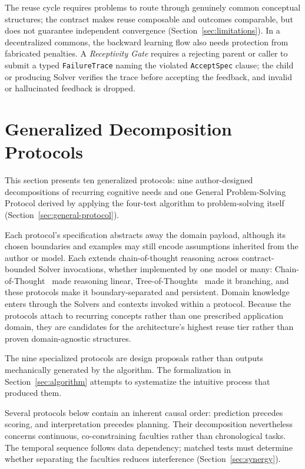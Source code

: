 \documentclass[11pt]{article}
\let\oldtexttt\texttt
\renewcommand{\texttt}[1]{\oldtexttt{\small #1}}
\begin{document}
The reuse cycle requires problems to route through genuinely common conceptual structures; the contract makes reuse composable and outcomes comparable, but does not guarantee independent convergence (Section~\ref{sec:limitations}). In a decentralized commons, the backward learning flow also needs protection from fabricated penalties. A \emph{Receptivity Gate}\label{sec:receptivity} requires a rejecting parent or caller to submit a typed \texttt{FailureTrace} naming the violated \texttt{AcceptSpec} clause; the child or producing Solver verifies the trace before accepting the feedback, and invalid or hallucinated feedback is dropped.

\section{Generalized Decomposition Protocols}
\label{sec:discussion}

This section presents ten generalized protocols: nine author-designed decompositions of recurring cognitive needs and one General Problem-Solving Protocol derived by applying the four-test algorithm to problem-solving itself (Section~\ref{sec:general-protocol}).

Each protocol's specification abstracts away the domain payload, although its chosen boundaries and examples may still encode assumptions inherited from the author or model. Each extends chain-of-thought reasoning across contract-bounded Solver invocations, whether implemented by one model or many: Chain-of-Thought~\cite{wei2022} made reasoning linear, Tree-of-Thoughts~\cite{yao2023} made it branching, and these protocols make it boundary-separated and persistent. Domain knowledge enters through the Solvers and contexts invoked within a protocol. Because the protocols attach to recurring concepts rather than one prescribed application domain, they are candidates for the architecture's highest reuse tier rather than proven domain-agnostic structures.

The nine specialized protocols are design proposals rather than outputs mechanically generated by the algorithm. The formalization in Section~\ref{sec:algorithm} attempts to systematize the intuitive process that produced them.

Several protocols below contain an inherent causal order: prediction precedes scoring, and interpretation precedes planning. Their decomposition nevertheless concerns continuous, co-constraining faculties rather than chronological tasks. The temporal sequence follows data dependency; matched tests must determine whether separating the faculties reduces interference (Section~\ref{sec:synergy}).
\end{document}
